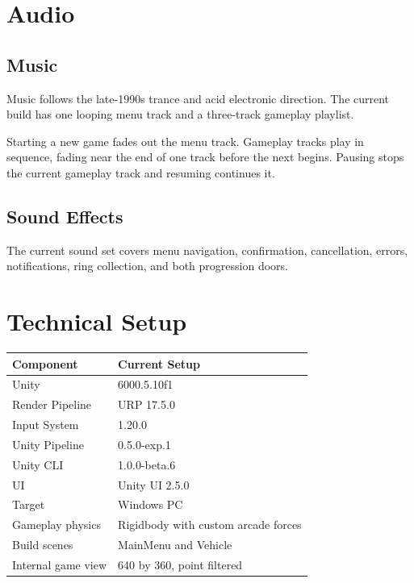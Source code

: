 \documentclass[11pt,a4paper]{article}
\begin{document}
\section{Audio}\label{audio}

\subsection{Music}\label{music}

Music follows the late-1990s trance and acid electronic direction. The current build has one looping menu track and a three-track gameplay playlist.

Starting a new game fades out the menu track. Gameplay tracks play in sequence, fading near the end of one track before the next begins. Pausing stops the current gameplay track and resuming continues it.

\subsection{Sound Effects}\label{sound-effects}

The current sound set covers menu navigation, confirmation, cancellation, errors, notifications, ring collection, and both progression doors.

\section{Technical Setup}\label{technical-setup}

\begin{longtable}[]{@{}ll@{}}
\toprule\noalign{}
\textbf{Component} & \textbf{Current Setup} \\
\midrule\noalign{}
\endhead
\bottomrule\noalign{}
\endlastfoot
Unity & 6000.5.10f1 \\
Render Pipeline & URP 17.5.0 \\
Input System & 1.20.0 \\
Unity Pipeline & 0.5.0-exp.1 \\
Unity CLI & 1.0.0-beta.6 \\
UI & Unity UI 2.5.0 \\
Target & Windows PC \\
Gameplay physics & Rigidbody with custom arcade forces \\
Build scenes & MainMenu and Vehicle \\
Internal game view & 640 by 360, point filtered \\
\end{longtable}
\end{document}
